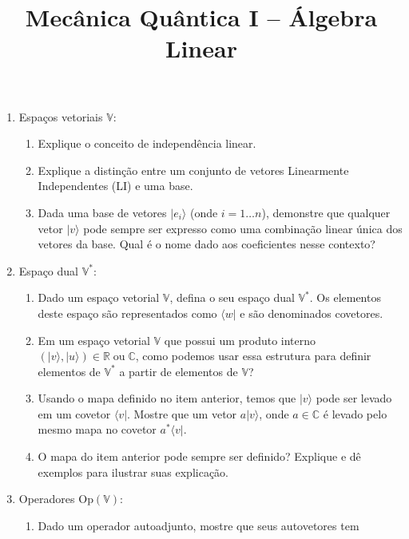 \newif\ifuseseminar
\useseminartrue


\title{Mecânica Quântica I -- Álgebra Linear}	



\begin{enumerate}
	\item Espaços vetoriais $\mathbb{V}$:
	      \begin{enumerate}
		      \item Explique o conceito de independência linear.
		      \item Explique a distinção entre um conjunto de vetores Linearmente
		            Independentes (LI) e uma base.
		      \item Dada uma base de vetores $|e_i\rangle$ (onde $i=1\dots n$), demonstre
		            que qualquer vetor $|v\rangle$ pode sempre ser expresso como uma combinação
		            linear única dos vetores da base. Qual é o nome dado aos coeficientes nesse
		            contexto?
	      \end{enumerate}
	\item Espaço dual $\mathbb{V}^*$:
	      \begin{enumerate}
		      \item Dado um espaço vetorial $\mathbb{V}$, defina o seu espaço dual
		            $\mathbb{V}^*$. Os elementos deste espaço são representados como
		            $\langle w|$ e são denominados covetores.
		      \item Em um espaço vetorial $\mathbb{V}$ que possui um produto interno
		            $\left(|v\rangle, |u\rangle\right) \in
			            \mathbb{R}\;\text{ou}\;\mathbb{C}$, como podemos usar essa estrutura
		            para definir elementos de $\mathbb{V}^*$ a partir de elementos de
		            $\mathbb{V}$?
		      \item Usando o mapa definido no item anterior, temos que $|v\rangle$ pode
		            ser levado em um covetor $\langle v|$. Mostre que um vetor
		            $a|v\rangle$, onde $a\in\mathbb{C}$ é levado pelo mesmo mapa no
		            covetor $a^*\langle v|$.
		      \item O mapa do item anterior pode sempre ser definido? Explique e dê
		            exemplos para ilustrar suas explicação.
	      \end{enumerate}
	\item Operadores $\mathrm{Op}\left(\mathbb{V}\right)$:
	      \begin{enumerate}
		      \item Dado um operador autoadjunto, mostre que seus autovetores tem

\end{enumerate}
\end{enumerate}
